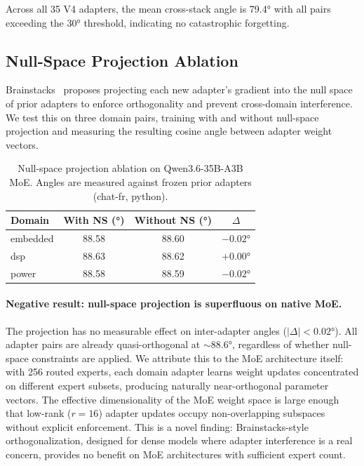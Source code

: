 \documentclass[11pt,a4paper]{article}
\begin{document}
Across all 35 V4 adapters, the mean cross-stack angle is 79.4° with all pairs exceeding the 30° threshold, indicating no catastrophic forgetting.

\subsection{Null-Space Projection Ablation}

Brainstacks~\citep{davison2024brainstacks} proposes projecting each new adapter's gradient into the null space of prior adapters to enforce orthogonality and prevent cross-domain interference. We test this on three domain pairs, training with and without null-space projection and measuring the resulting cosine angle between adapter weight vectors.

\begin{table}[h]
\centering
\caption{Null-space projection ablation on Qwen3.6-35B-A3B MoE. Angles are measured against frozen prior adapters (chat-fr, python).}
\label{tab:nullspace}
\begin{tabular}{lccc}
\toprule
\textbf{Domain} & \textbf{With NS (°)} & \textbf{Without NS (°)} & \textbf{$\Delta$} \\
\midrule
embedded & 88.58 & 88.60 & $-0.02$° \\
dsp & 88.63 & 88.62 & $+0.00$° \\
power & 88.58 & 88.59 & $-0.02$° \\
\bottomrule
\end{tabular}
\end{table}

\paragraph{Negative result: null-space projection is superfluous on native MoE.}
The projection has no measurable effect on inter-adapter angles ($|\Delta| < 0.02$°). All adapter pairs are already quasi-orthogonal at ${\sim}88.6$°, regardless of whether null-space constraints are applied. We attribute this to the MoE architecture itself: with 256 routed experts, each domain adapter learns weight updates concentrated on different expert subsets, producing naturally near-orthogonal parameter vectors. The effective dimensionality of the MoE weight space is large enough that low-rank ($r{=}16$) adapter updates occupy non-overlapping subspaces without explicit enforcement. This is a novel finding: Brainstacks-style orthogonalization, designed for dense models where adapter interference is a real concern, provides no benefit on MoE architectures with sufficient expert count.
\end{document}
